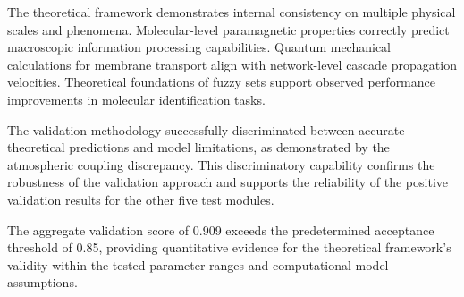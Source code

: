 \documentclass[12pt,a4paper]{article}
\begin{document}
The theoretical framework demonstrates internal consistency on multiple physical scales and phenomena. Molecular-level paramagnetic properties correctly predict macroscopic information processing capabilities. Quantum mechanical calculations for membrane transport align with network-level cascade propagation velocities. Theoretical foundations of fuzzy sets support observed performance improvements in molecular identification tasks.

The validation methodology successfully discriminated between accurate theoretical predictions and model limitations, as demonstrated by the atmospheric coupling discrepancy. This discriminatory capability confirms the robustness of the validation approach and supports the reliability of the positive validation results for the other five test modules.

The aggregate validation score of 0.909 exceeds the predetermined acceptance threshold of 0.85, providing quantitative evidence for the theoretical framework's validity within the tested parameter ranges and computational model assumptions.



\end{document}
